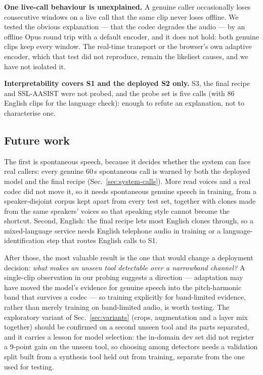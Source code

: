 \textbf{One live-call behaviour is unexplained.} A genuine caller occasionally loses
consecutive windows on a live call that the same clip never loses offline. We tested
the obvious explanation --- that the codec degrades the audio --- by an offline Opus
round trip with a default encoder, and it does not hold: both genuine clips keep every
window. The real-time transport or the browser's own adaptive encoder, which that test
did not reproduce, remain the likeliest causes, and we have not isolated it.

\textbf{Interpretability covers S1 and the deployed S2 only.} S3, the final recipe and
SSL-AASIST were not probed, and the probe set is five calls (with 86 English clips for
the language check): enough to refute an explanation, not to characterise one.

\subsection{Future work}

The first is spontaneous speech, because it decides whether the system can face real
callers: every genuine 60\,s spontaneous call is warned by both the deployed model and the
final recipe (Sec.~\ref{sec:system-calls}). More read voices and a real codec did not move
it, so it needs spontaneous genuine speech in training, from a speaker-disjoint corpus kept
apart from every test set, together with clones made from the same speakers' voices so that
speaking style cannot become the shortcut. Second, English: the final recipe lets most
English clones through, so a mixed-language service needs English telephone audio in
training or a language-identification step that routes English calls to S1.

After those, the most valuable result is the one that would change a deployment decision:
\emph{what makes an unseen tool detectable over a narrowband channel?} A single-clip
observation in our probing suggests a direction --- adaptation may have moved the model's
evidence for genuine speech into the pitch-harmonic band that survives a codec --- so
training explicitly for band-limited evidence, rather than merely training on band-limited
audio, is worth testing. The exploratory variant of Sec.~\ref{sec:variants} (crops,
augmentation and a layer mix together) should be confirmed on a second unseen tool and its
parts separated, and it carries a lesson for model selection: the in-domain dev set
did not register a 9-point gain on the unseen tool, so choosing among detectors needs
a validation split built from a synthesis tool held out from training, separate from
the one used for testing.

